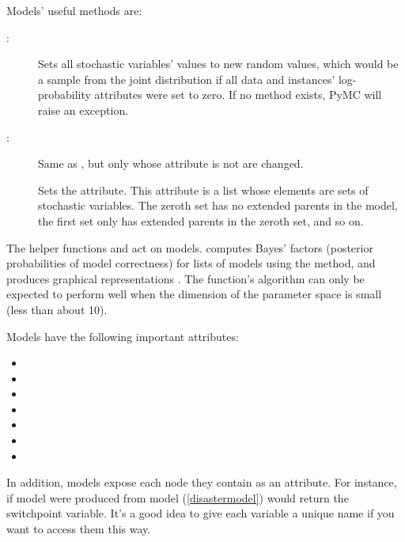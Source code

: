 Models' useful methods are:
\begin{description}
    \item[:] Sets all stochastic variables' values to new random values, which would be a sample from the joint distribution if all data and  instances' log-probability attributes were set to zero. If no  method exists, PyMC will raise an exception.
    \item[:] Same as , but only  whose  attribute is not  are changed.
    \item[] Sets the  attribute. This attribute is a list whose elements are sets of stochastic variables. The zeroth set has no extended parents in the model, the first set only has extended parents in the zeroth set, and so on.
\end{description}

The helper functions  and  act on models.  computes Bayes' factors (posterior probabilities of model correctness) for lists of models using the  method, and  produces graphical representations \cite[see]{Jordan:2004p5439}. The  function's algorithm can only be expected to perform well when the dimension of the parameter space is small (less than about 10).

Models have the following important attributes:
\begin{itemize}
    \item {}
    \item {}
    \item {}
    \item {}
    \item {}
    \item {}
    \item {}
\end{itemize}

In addition, models expose each node they contain as an attribute. For instance, if model  were produced from model (\ref{disastermodel})  would return the switchpoint variable. It's a good idea to give each variable a unique name if you want to access them this way.


